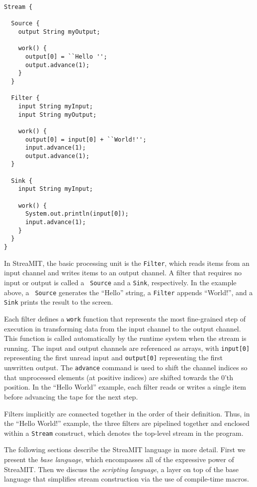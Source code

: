 \documentclass[draft]{article}
\begin{document}
\begin{verbatim}
Stream {

  Source {
    output String myOutput;

    work() {
      output[0] = ``Hello '';
      output.advance(1);
    }
  }

  Filter {
    input String myInput;
    input String myOutput;

    work() {
      output[0] = input[0] + ``World!'';
      input.advance(1);
      output.advance(1);
  }

  Sink {
    input String myInput;
    
    work() {
      System.out.println(input[0]);
      input.advance(1);
    }
  }
}
\end{verbatim}

In StreaMIT, the basic processing unit is the {\tt Filter}, which
reads items from an input channel and writes items to an output
channel.  A filter that requires no input or output is called a {\tt
Source} and a {\tt Sink}, respectively.  In the example above, a {\tt
Source} generates the ``Hello'' string, a {\tt Filter} appends
``World!'', and a {\tt Sink} prints the result to the screen.

Each filter defines a {\tt work} function that represents the most
fine-grained step of execution in transforming data from the input
channel to the output channel.  This function is called automatically
by the runtime system when the stream is running.  The input and
output channels are referenced as arrays, with {\tt input[0]}
representing the first unread input and {\tt output[0]} representing
the first unwritten output.  The {\tt advance} command is used to
shift the channel indices so that unprocessed elements (at positive
indices) are shifted towards the 0'th position.  In the ``Hello
World'' example, each filter reads or writes a single item before
advancing the tape for the next step.

Filters implicitly are connected together in the order of their
definition.  Thus, in the ``Hello World!'' example, the three filters
are pipelined together and enclosed within a {\tt Stream} construct,
which denotes the top-level stream in the program.

The following sections describe the StreaMIT language in more detail.
First we present the {\it base language}, which encompasses all of the
expressive power of StreaMIT.  Then we discuss the {\it scripting
language}, a layer on top of the base language that simplifies stream
construction via the use of compile-time macros.
\end{document}
